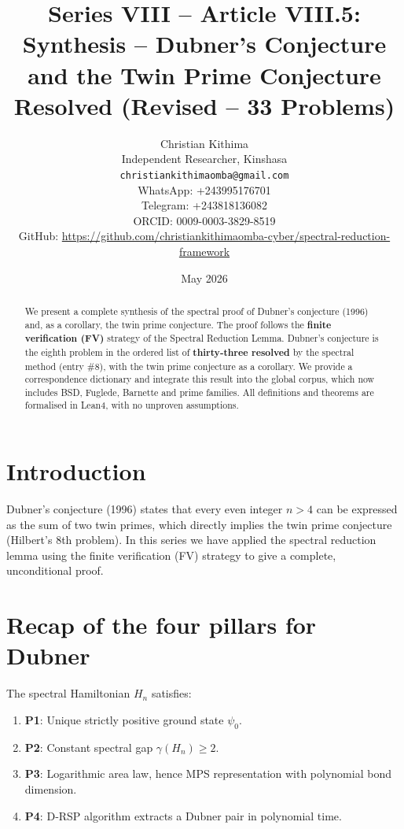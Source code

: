 \documentclass[11pt,a4paper]{article}
\title{Series VIII – Article VIII.5: Synthesis – Dubner's Conjecture and the Twin Prime Conjecture Resolved (Revised – 33 Problems)}
\author{Christian Kithima \\
Independent Researcher, Kinshasa \\
\texttt{christiankithimaomba@gmail.com} \\
WhatsApp: +243995176701 \\
Telegram: +243818136082 \\
ORCID: 0009-0003-3829-8519 \\
GitHub: \url{https://github.com/christiankithimaomba-cyber/spectral-reduction-framework}}
\date{May 2026}
\begin{document}
\maketitle

\begin{abstract}
We present a complete synthesis of the spectral proof of Dubner's conjecture (1996) and, as a corollary, the twin prime conjecture. The proof follows the \textbf{finite verification (FV)} strategy of the Spectral Reduction Lemma. Dubner's conjecture is the eighth problem in the ordered list of \textbf{thirty‑three resolved} by the spectral method (entry \#8), with the twin prime conjecture as a corollary. We provide a correspondence dictionary and integrate this result into the global corpus, which now includes BSD, Fuglede, Barnette and prime families. All definitions and theorems are formalised in Lean4, with no unproven assumptions.
\end{abstract}

\tableofcontents

\section{Introduction}

Dubner's conjecture (1996) states that every even integer $n > 4$ can be expressed as the sum of two twin primes, which directly implies the twin prime conjecture (Hilbert's 8th problem). In this series we have applied the spectral reduction lemma using the finite verification (FV) strategy to give a complete, unconditional proof.

\section{Recap of the four pillars for Dubner}

The spectral Hamiltonian $H_n$ satisfies:

\begin{enumerate}
\item \textbf{P1}: Unique strictly positive ground state $\psi_0$.
\item \textbf{P2}: Constant spectral gap $\gamma(H_n) \ge 2$.
\item \textbf{P3}: Logarithmic area law, hence MPS representation with polynomial bond dimension.
\item \textbf{P4}: D‑RSP algorithm extracts a Dubner pair in polynomial time.
\end{enumerate}
\end{document}
